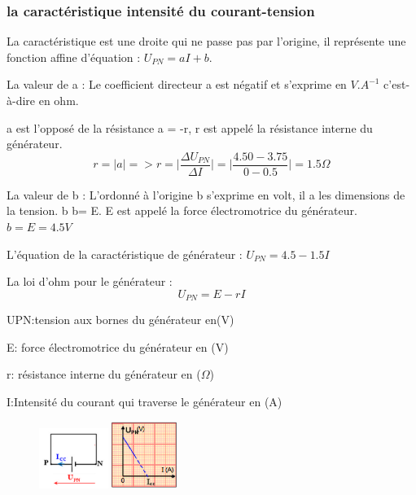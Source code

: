 \documentclass[12pt]{article}
\begin{document}
\subsubsection{ la caractéristique intensité du
courant-tension}
La caractéristique est une droite qui ne passe pas
par l’origine, il représente une fonction affine
d’équation : $U_{PN} = aI + b$.

La valeur de a : Le coefficient directeur a est négatif et s’exprime
en $V.A^{-1}$ c’est-à-dire en ohm. 

a est l’opposé de la résistance a = -r, r est
appelé la résistance interne du générateur. $$r = \lvert{a}\rvert=> r = \lvert\frac{\Delta{U_{PN}}}{\Delta{I}}\rvert = \lvert\frac{4.50-3.75}{0-0.5}\rvert= 1.5\Omega$$

La valeur de b :
L’ordonné à l’origine b s’exprime en volt, il a les dimensions de la tension. b b= E.
E est appelé la force électromotrice du générateur. $b = E = 4.5V$

L’équation de la caractéristique de générateur : $U_{PN} = 4.5 - 1.5I$

\begin{tcolorbox}{La loi d’ohm pour le générateur : }
  $$U_{PN} = E - rI$$

  UPN:tension aux bornes du générateur en(V)

  E: force électromotrice du générateur en (V)

  r: résistance interne du générateur en ($\Omega$)

I:Intensité du courant qui traverse le générateur en (A)
\end{tcolorbox}
\begin{figure}
\begin{center}
  \vspace{-2.6cm}
\includegraphics[width=0.2\textwidth]{./img/Icc_montage.png}
\includegraphics[width=0.19\textwidth]{./img/Icc_carca.png}
\end{center}
\end{figure}
\end{document}
